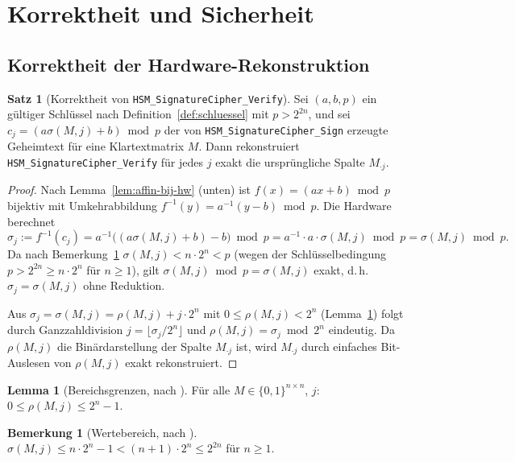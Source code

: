﻿\documentclass[a4paper,12pt]{article}
\theoremstyle{definition}
\newtheorem{satz}{Satz}
\newtheorem{lemma}{Lemma}
\newtheorem{bemerkung}{Bemerkung}
\begin{document}
\section{Korrektheit und Sicherheit}
\label{sec:korrektheit}

\subsection{Korrektheit der Hardware-Rekonstruktion}

\begin{satz}[Korrektheit von \texttt{HSM\_SignatureCipher\_Verify}]
	\label{satz:hw-korrektheit}
	Sei $(a,b,p)$ ein gültiger Schlüssel nach Definition~\ref{def:schluessel} mit $p > 2^{2n}$, und sei $c_j = (a\sigma(M,j)+b) \bmod p$ der von \texttt{HSM\_SignatureCipher\_Sign} erzeugte Geheimtext für eine Klartextmatrix $M$. Dann rekonstruiert \texttt{HSM\_SignatureCipher\_Verify} für jedes $j$ exakt die ursprüngliche Spalte $M_{\cdot j}$.
\end{satz}

\begin{proof}
	Nach Lemma~\ref{lem:affin-bij-hw} (unten) ist $f(x) = (ax+b)\bmod p$ bijektiv mit Umkehrabbildung $f^{-1}(y) = a^{-1}(y-b)\bmod p$. Die Hardware berechnet
	\[
	\sigma_j := f^{-1}(c_j) = a^{-1}\bigl((a\sigma(M,j)+b) - b\bigr) \bmod p = a^{-1} \cdot a \cdot \sigma(M,j) \bmod p = \sigma(M,j) \bmod p.
	\]
	Da nach Bemerkung~\ref{bem:wertebereich-hw} $\sigma(M,j) < n \cdot 2^n < p$ (wegen der Schlüsselbedingung $p > 2^{2n} \ge n \cdot 2^n$ für $n \ge 1$), gilt $\sigma(M,j) \bmod p = \sigma(M,j)$ exakt, d.\,h.\ $\sigma_j = \sigma(M,j)$ ohne Reduktion.
	
	Aus $\sigma_j = \sigma(M,j) = \rho(M,j) + j \cdot 2^n$ mit $0 \le \rho(M,j) < 2^n$ (Lemma~\ref{lem:rho-bounds-hw}) folgt durch Ganzzahldivision $j = \lfloor \sigma_j / 2^n \rfloor$ und $\rho(M,j) = \sigma_j \bmod 2^n$ eindeutig. Da $\rho(M,j)$ die Binärdarstellung der Spalte $M_{\cdot j}$ ist, wird $M_{\cdot j}$ durch einfaches Bit-Auslesen von $\rho(M,j)$ exakt rekonstruiert. \qedhere
\end{proof}

\begin{lemma}[Bereichsgrenzen, nach \cite{Epp26b}]
	\label{lem:rho-bounds-hw}
	Für alle $M \in \{0,1\}^{n\times n}$, $j$: $0 \le \rho(M,j) \le 2^n - 1$.
\end{lemma}

\begin{bemerkung}[Wertebereich, nach \cite{Epp26b}]
	\label{bem:wertebereich-hw}
	$\sigma(M,j) \le n \cdot 2^n - 1 < (n+1)\cdot 2^n \le 2^{2n}$ für $n \ge 1$.
\end{bemerkung}
\end{document}
